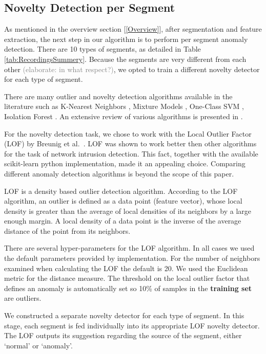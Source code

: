 \documentclass[conference]{IEEEtran}
\begin{document}
\subsection{Novelty Detection per Segment}
  As mentioned in the overview section [\ref{Overview}], after segmentation and feature  extraction, the next step in our algorithm is to perform per segment anomaly  detection. There are 10 types of segments, as detailed in Table \ref{tab:RecordingsSummery}. Because the segments are very different from each other \textcolor{gray}{(elaborate: in what respect?)}, we opted to train a different novelty detector for each type of segment.
  
  There are many outlier and novelty detection algorithms available in the literature such as K-Nearest Neighbors \cite{hautamaki2004outlier}, Mixture Models \cite{}, One-Class SVM \cite{}, Isolation Forest \cite{liu2008isolation}. An extensive review of various algorithms is presented in \cite{pimentel2014review}.
  
  For the novelty detection task, we chose to work with the Local Outlier Factor (LOF) by Breunig et al.\ \cite{breunig2000lof}. LOF was shown to work better then other algorithms for the task of network intrusion detection\cite{lazarevic2003comparative}. This fact, together with the available scikit-learn \cite{scikit-learn} python implementation, made it an appealing choice. Comparing different anomaly detection algorithms is beyond the scope of this paper.
  
  LOF is a density based outlier detection algorithm. According to the LOF algorithm, an outlier is defined as a data point (feature vector), whose local density is greater than the average of local densities of its neighbors by a large enough margin. A local density of a data point is the inverse of the average distance of the point from its neighbors.
  
  There are several hyper-parameters for the LOF algorithm. In all cases we used the default parameters provided by implementation. For the number of neighbors examined when calculating the LOF the default is 20. We used the Euclidean metric for the distance measure. The threshold on the local outlier factor that defines an anomaly is automatically set so 10\% of samples in the \textbf{training set} are outliers.
  
  We constructed a separate novelty detector for each type of segment. In this stage, each segment is fed individually into its appropriate LOF novelty detector. The LOF outputs its suggestion regarding the source of the segment, either `normal' or `anomaly'.
  
\end{document}
